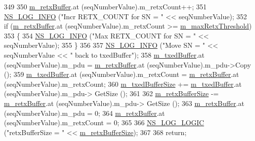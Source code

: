 \begin{DoxyCode}
349 
350                   \hyperlink{classns3_1_1LteRlcAm_ab34bb5fce080a41395ad7ea5789af8d0}{m\_retxBuffer}.at (seqNumberValue).m\_retxCount++;
351                   \hyperlink{group__logging_gafbd73ee2cf9f26b319f49086d8e860fb}{NS\_LOG\_INFO} (\textcolor{stringliteral}{"Incr RETX\_COUNT for SN = "} << seqNumberValue);
352                   \textcolor{keywordflow}{if} (\hyperlink{classns3_1_1LteRlcAm_ab34bb5fce080a41395ad7ea5789af8d0}{m\_retxBuffer}.at (seqNumberValue).m\_retxCount >= 
      \hyperlink{classns3_1_1LteRlcAm_aabcdbe26fb6621b75d7727edef2b655e}{m\_maxRetxThreshold})
353                     \{
354                       \hyperlink{group__logging_gafbd73ee2cf9f26b319f49086d8e860fb}{NS\_LOG\_INFO} (\textcolor{stringliteral}{"Max RETX\_COUNT for SN = "} << seqNumberValue);
355                     \}
356 
357                   \hyperlink{group__logging_gafbd73ee2cf9f26b319f49086d8e860fb}{NS\_LOG\_INFO} (\textcolor{stringliteral}{"Move SN = "} << seqNumberValue << \textcolor{stringliteral}{" back to txedBuffer"});
358                   \hyperlink{classns3_1_1LteRlcAm_afabb45c6de7da492347b45c139de0c28}{m\_txedBuffer}.at (seqNumberValue).m\_pdu = 
      \hyperlink{classns3_1_1LteRlcAm_ab34bb5fce080a41395ad7ea5789af8d0}{m\_retxBuffer}.at (seqNumberValue).m\_pdu->Copy ();
359                   \hyperlink{classns3_1_1LteRlcAm_afabb45c6de7da492347b45c139de0c28}{m\_txedBuffer}.at (seqNumberValue).m\_retxCount = 
      \hyperlink{classns3_1_1LteRlcAm_ab34bb5fce080a41395ad7ea5789af8d0}{m\_retxBuffer}.at (seqNumberValue).m\_retxCount;
360                   \hyperlink{classns3_1_1LteRlcAm_add3fe05a0fd3a4ad1fcb7db0239c698f}{m\_txedBufferSize} += \hyperlink{classns3_1_1LteRlcAm_afabb45c6de7da492347b45c139de0c28}{m\_txedBuffer}.at (seqNumberValue).m\_pdu->
      GetSize ();
361 
362                   \hyperlink{classns3_1_1LteRlcAm_af270916ffd1805b027a7b9cc05c91e7d}{m\_retxBufferSize} -= \hyperlink{classns3_1_1LteRlcAm_ab34bb5fce080a41395ad7ea5789af8d0}{m\_retxBuffer}.at (seqNumberValue).m\_pdu->
      GetSize ();
363                   \hyperlink{classns3_1_1LteRlcAm_ab34bb5fce080a41395ad7ea5789af8d0}{m\_retxBuffer}.at (seqNumberValue).m\_pdu = 0;
364                   \hyperlink{classns3_1_1LteRlcAm_ab34bb5fce080a41395ad7ea5789af8d0}{m\_retxBuffer}.at (seqNumberValue).m\_retxCount = 0;
365                   
366                   \hyperlink{group__logging_ga88acd260151caf2db9c0fc84997f45ce}{NS\_LOG\_LOGIC} (\textcolor{stringliteral}{"retxBufferSize = "} << 
      \hyperlink{classns3_1_1LteRlcAm_af270916ffd1805b027a7b9cc05c91e7d}{m\_retxBufferSize});
367 
368                   \textcolor{keywordflow}{return};

\end{DoxyCode}
